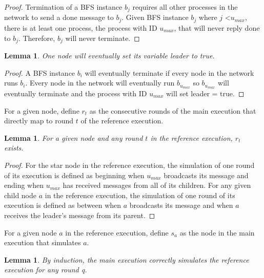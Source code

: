 \documentclass[english]{article}
\newtheorem{lemma}[theorem]{Lemma}
\begin{document}
\begin{proof}
Termination of a BFS instance $b_j$ requires all other processes in the network to send a done message to $b_j$.
Given BFS instance $b_j$ where $j$ \textless $u_{max}$, there is at least one process, the process with ID $u_{max}$, that will never reply done to $b_j$.
Therefore, $b_j$ will never terminate.
\end{proof}

\begin{lemma}
\label{LELivenessStatic}
  One node will eventually set its variable leader to true.
\end{lemma}
\begin{proof}
A BFS instance $b_i$ will eventually terminate if every node in the network runs $b_i$. 
Every node in the network will eventually run $b_{u_{max}}$ so $b_{u_{max}}$ will eventually terminate and the process with ID $u_{max}$ will set leader = true.
\end{proof}

\begin{definition}
For a given node, define $r_t$ as the consecutive rounds of the main execution that directly map to round $t$ of the reference execution.
\end{definition}

\begin{lemma}
\label{SimulationRoundRelation}
For a given node and any round $t$ in the reference execution, $r_t$ exists.
\end{lemma}

\begin{proof}
For the star node in the reference execution, the simulation of one round of its execution is defined as beginning when $u_{max}$ broadcasts its message and ending when $u_{max}$ has received messages from all of its children.
For any given child node $a$ in the reference execution, the simulation of one round of its execution is defined as between when $a$ broadcasts its message and when $a$ receives the leader's message from its parent.
\end{proof}

\begin{definition}
For a given node $a$ in the reference execution, define $s_a$ as the node in the main execution that simulates $a$.
\end{definition}

\begin{lemma}
\label{Simulation}
  By induction, the main execution correctly simulates the reference execution for any round q.
\end{lemma}
\end{document}

